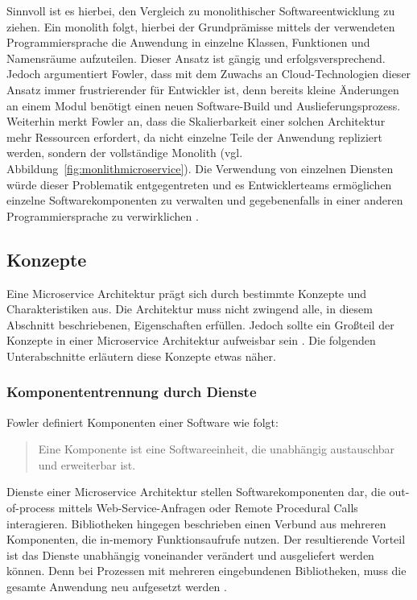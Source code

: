 Sinnvoll ist es hierbei, den Vergleich zu monolithischer Softwareentwicklung zu ziehen. 
Ein monolith folgt, hierbei der Grundprämisse mittels der verwendeten Programmiersprache die Anwendung in einzelne Klassen, Funktionen und Namensräume aufzuteilen. 
Dieser Ansatz ist gängig und erfolgsversprechend. 
Jedoch argumentiert Fowler, dass mit dem Zuwachs an Cloud-Technologien dieser Ansatz immer frustrierender für Entwickler ist, denn bereits kleine Änderungen an einem Modul benötigt einen neuen Software-Build und Auslieferungsprozess. 
Weiterhin merkt Fowler an, dass die Skalierbarkeit einer solchen Architektur mehr Ressourcen erfordert, da nicht einzelne Teile der Anwendung repliziert werden, sondern der vollständige Monolith (vgl. Abbildung~\ref{fig:monlithmicroservice}).
Die Verwendung von einzelnen Diensten würde dieser Problematik entgegentreten und es Entwicklerteams ermöglichen einzelne Softwarekomponenten zu verwalten und gegebenenfalls in einer anderen Programmiersprache zu verwirklichen \cite{FowlerMicroservice}.

\subsection{Konzepte}

Eine Microservice Architektur prägt sich durch bestimmte Konzepte und Charakteristiken aus. 
Die Architektur muss nicht zwingend alle, in diesem Abschnitt beschriebenen, Eigenschaften erfüllen. 
Jedoch sollte ein Großteil der Konzepte in einer Microservice Architektur aufweisbar sein \cite{FowlerMicroservice}. 
Die folgenden Unterabschnitte erläutern diese Konzepte etwas näher.

\subsubsection{Komponententrennung durch Dienste}
Fowler definiert Komponenten einer Software wie folgt: \begin{quote}\glqq Eine Komponente ist eine Softwareeinheit, die unabhängig austauschbar und erweiterbar ist.\grqq{} \cite{FowlerSoftwareComponent} \end{quote}

Dienste einer Microservice Architektur stellen Softwarekomponenten dar, die out-of-process mittels Web-Service-Anfragen oder Remote Procedural Calls interagieren.
Bibliotheken hingegen beschrieben einen Verbund aus mehreren Komponenten, die in-memory Funktionsaufrufe nutzen. 
Der resultierende Vorteil ist das Dienste unabhängig voneinander verändert und ausgeliefert werden können. 
Denn bei Prozessen mit mehreren eingebundenen Bibliotheken, muss die gesamte Anwendung neu aufgesetzt werden \cite{FowlerMicroservice}. 

